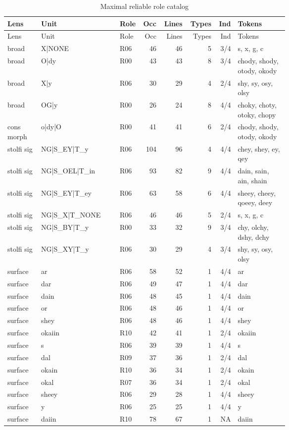 \small
\setlength{\tabcolsep}{4pt}
\begin{longtable}{p{0.12\linewidth}p{0.29\linewidth}p{0.07\linewidth}rrrrp{0.18\linewidth}}
\caption{Maximal reliable role catalog}\label{tabcatalog}\\
\toprule
Lens & Unit & Role & Occ & Lines & Types & Ind & Tokens \\
\midrule
\endfirsthead
\toprule
Lens & Unit & Role & Occ & Lines & Types & Ind & Tokens \\
\midrule
\endhead
broad & X|NONE & R06 & 46 & 46 & 5 & 3/4 & s, x, g, c \\
broad & O|dy & R00 & 43 & 43 & 8 & 3/4 & chody, shody, otody, okody \\
broad & X|y & R06 & 30 & 29 & 4 & 2/4 & shy, sy, osy, olsy \\
broad & OG|y & R00 & 26 & 24 & 8 & 4/4 & choky, choty, otoky, chopy \\
cons morph & o|dy|O & R00 & 41 & 41 & 6 & 2/4 & chody, shody, otody, okody \\
stolfi sig & NG|S\_EY|T\_y & R06 & 104 & 96 & 4 & 4/4 & chey, shey, ey, qey \\
stolfi sig & NG|S\_OEL|T\_in & R06 & 93 & 82 & 9 & 4/4 & dain, sain, ain, shain \\
stolfi sig & NG|S\_EY|T\_ey & R06 & 63 & 58 & 6 & 4/4 & sheey, cheey, qoeey, deey \\
stolfi sig & NG|S\_X|T\_NONE & R06 & 46 & 46 & 5 & 2/4 & s, x, g, c \\
stolfi sig & NG|S\_BY|T\_y & R00 & 33 & 32 & 9 & 3/4 & chy, olchy, dshy, dchy \\
stolfi sig & NG|S\_XY|T\_y & R06 & 30 & 29 & 4 & 3/4 & shy, sy, osy, olsy \\
surface & ar & R06 & 58 & 52 & 1 & 4/4 & ar \\
surface & dar & R06 & 49 & 47 & 1 & 4/4 & dar \\
surface & dain & R06 & 48 & 45 & 1 & 4/4 & dain \\
surface & or & R06 & 48 & 46 & 1 & 4/4 & or \\
surface & shey & R06 & 48 & 46 & 1 & 4/4 & shey \\
surface & okaiin & R10 & 42 & 41 & 1 & 2/4 & okaiin \\
surface & s & R06 & 39 & 39 & 1 & 4/4 & s \\
surface & dal & R09 & 37 & 36 & 1 & 2/4 & dal \\
surface & okain & R10 & 36 & 34 & 1 & 2/4 & okain \\
surface & okal & R07 & 36 & 34 & 1 & 2/4 & okal \\
surface & sheey & R06 & 29 & 28 & 1 & 4/4 & sheey \\
surface & y & R06 & 25 & 25 & 1 & 4/4 & y \\
surface & daiin & R10 & 78 & 67 & 1 & NA & daiin \\
\bottomrule
\end{longtable}
